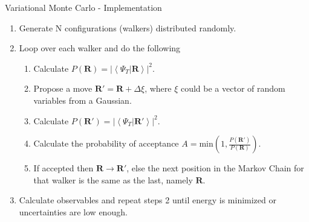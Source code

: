 \documentclass{beamer}
\newcommand{\braket}[2]{\left< #1 | #2 \right>}
\newcommand{\R}{\mathbf{R}}
\begin{document}
\iffalse
\appendix
\begin{frame}{Variational Monte Carlo - Implementation}
\begin{enumerate}
   \item Generate N configurations (walkers) distributed randomly.
   \item Loop over each walker and do the following
   \begin{enumerate}
      \setlength\itemsep{0.2em}
      \item Calculate $P(\R) = \left|\braket{\Psi_T}{\R}\right|^2$.
      \item Propose a move $\R' = \R + \Delta\xi$, where $\xi$ could be a vector of random variables from a Gaussian.
      \item Calculate $P(\R') = \left|\braket{\Psi_T}{\R'}\right|^2$.
      \item Calculate the probability of acceptance $A=\mathrm{min}\left(1,\frac{P(\R')}{P(\R)}\right)$.
      \item If accepted then $\R \rightarrow \R'$, else the next position in the Markov Chain for that walker is the same as the last, namely $\R$.
   \end{enumerate}
   \item Calculate observables and repeat steps 2 until energy is minimized or uncertainties are low enough.
\end{enumerate}
\end{frame}
\end{document}
